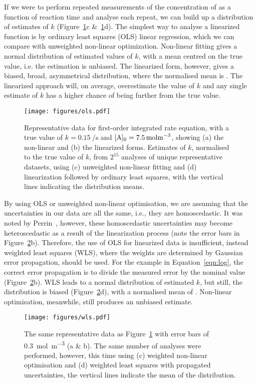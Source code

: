 \documentclass[journal=jceda8,manuscript=article]{achemso}
\begin{document}
If we were to perform repeated measurements of the concentration of  as a function of reaction time and analyse each repeat, we can build up a distribution of estimates of $k$ (Figure~\ref{fig:ols}c \&~\ref{fig:ols}d). 
The simplest way to analyse a linearized function is by ordinary least squares (OLS) linear regression, which we can compare with unweighted non-linear optimization. 
Non-linear fitting gives a normal distribution of estimated values of $k$, with a mean centred on the true value, i.e. the estimation is unbiased. 
The linearized form, however, gives a biased, broad, asymmetrical distribution, where the normalised mean is .
The linearized approach will, on average, overestimate the value of $k$ and any single estimate of $k$ has a higher chance of being further from the true value. 
%
\begin{figure}
  \texttt{[image: figures/ols.pdf]}
  \caption{
    Representative data for first-order integrated rate equation, with a true value of $k=\SI{0.15}{\per\second}$ and $[\ce{A}]_0=\SI{7.5}{\mol\m^{-3}}$, showing (a) the non-linear and (b) the linearized forms. 
    Estimates of $k$, normalised to the true value of $k$, from $2^{15}$ analyses of unique representative datasets, using (c) unweighted non-linear fitting and (d) linearization followed by ordinary least squares, with the vertical lines indicating the distribution means.
    }
  \label{fig:ols}
\end{figure}
%

By using OLS or unweighted non-linear optimisation, we are assuming that the uncertainties in our data are all the same, i.e., they are homoscedastic. 
It was noted by Perrin~\cite{perrin_linear_2017}, however, these homoscedastic uncertainties may become heteroscedastic as a result of the linearization process (note the error bars in Figure~\ref{fig:wls}b). 
Therefore, the use of OLS for linearized data is insufficient, instead weighted least squares (WLS), where the weights are determined by Gaussian error propagation, should be used.
For the example in Equation~\ref{eqn:log}, the correct error propagation is to divide the measured error by the nominal value (Figure~\ref{fig:wls}b).
WLS leads to a normal distribution of estimated $k$, but still, the distribution is biased (Figure~\ref{fig:wls}d), with a normalised mean of .
Non-linear optimisation, meanwhile, still produces an unbiased estimate.
%
\begin{figure}
  \texttt{[image: figures/wls.pdf]}
  \caption{
    The same representative data as Figure~\ref{fig:ols} with error bars of \SI{0.3}{{\mol\m^{-3}}} (a \& b).
    The same number of analyses were performed, however, this time using (c) weighted non-linear optimisation and (d) weighted least squares with propagated uncertainties, the vertical lines indicate the mean of the distribution. 
    }
  \label{fig:wls}
\end{figure}
%
\end{document}
